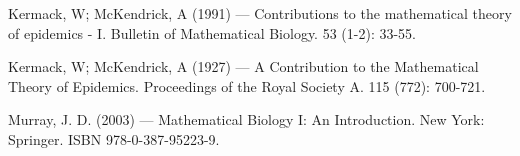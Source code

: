 %
%
% 
% 
%

\begin{thebibliography}{99.}

 Kermack, W; McKendrick, A (1991) --- Contributions to the mathematical theory of epidemics - I. Bulletin of Mathematical Biology. 53 (1-2): 33-55.

 Kermack, W; McKendrick, A (1927) --- A Contribution to the Mathematical Theory of Epidemics. Proceedings of the Royal Society A. 115 (772): 700-721.

 Murray, J. D. (2003) --- Mathematical Biology I: An Introduction. 
New York: Springer. ISBN 978-0-387-95223-9.

\end{thebibliography}
